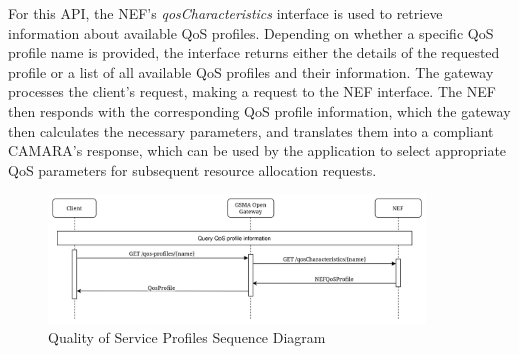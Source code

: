 For this API, the NEF’s \emph{qosCharacteristics} interface is used to retrieve information about available QoS profiles. Depending on whether a specific QoS profile name is provided, the interface returns either the details of the requested profile or a list of all available QoS profiles and their information. The gateway processes the client’s request, making a request to the NEF interface. The NEF then responds with the corresponding QoS profile information, which the gateway then calculates the necessary parameters, and translates them into a compliant CAMARA's response, which can be used by the application to select appropriate QoS parameters for subsequent resource allocation requests.

\begin{figure}[H]
	\centerline{
		\includegraphics[width=10cm]{figs/QoS_profiles_sequence_diagram.png}
	}
	\caption{Quality of Service Profiles Sequence Diagram}
\end{figure}
